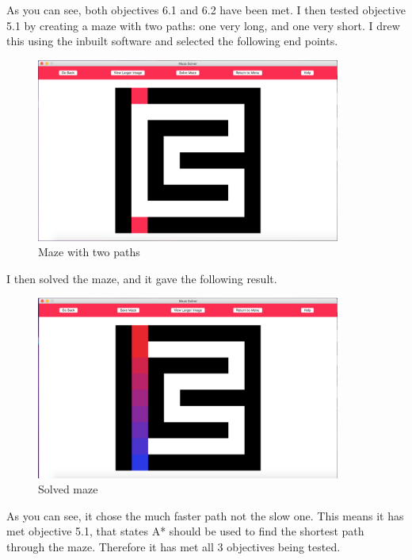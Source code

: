 \documentclass[titlepage]{article}
\begin{document}
As you can see, both objectives 6.1 and 6.2 have been met. I then tested objective 5.1 by creating a maze with two paths: one very long, and one very short. I drew this using the inbuilt software and selected the following end points.

\begin{figure}[H]
  \centering
  \includegraphics[width=10cm]{lonshor.png}
  \caption{Maze with two paths}
  \label{fig:dijk}
\end{figure}

I then solved the maze, and it gave the following result.

\begin{figure}[H]
  \centering
  \includegraphics[width=10cm]{lonsln.png}
  \caption{Solved maze}
  \label{fig:dijk}
\end{figure}

As you can see, it chose the much faster path not the slow one. This means it has met objective 5.1, that states A* should be used to find the shortest path through the maze. Therefore it has met all 3 objectives being tested.
\end{document}
